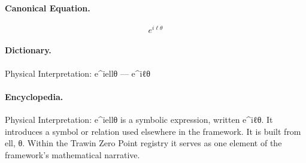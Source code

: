 \paragraph{Canonical Equation.}
\[
e^{i\ell\theta}
\]

\paragraph{Dictionary.}
Physical Interpretation: e\textasciicircum{}iellθ — e\textasciicircum{}iℓθ

\paragraph{Encyclopedia.}
Physical Interpretation: e\textasciicircum{}iellθ is a symbolic expression, written e\textasciicircum{}iℓθ. It introduces a symbol or relation used elsewhere in the framework. It is built from ell, θ. Within the Trawin Zero Point registry it serves as one element of the framework's mathematical narrative.
